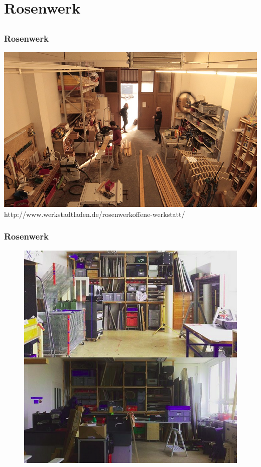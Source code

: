 \documentclass[12pt]{beamer}
\newcommand{\license}[2][]{\\#2\ifthenelse{\equal{#1}{}}{}{\\\scriptsize\url{#1}}}
\begin{document}
\section{Rosenwerk}
	\subsection{}

\begin{frame}
  \frametitle{Rosenwerk}
  \begin{minipage}{\linewidth}
	\centering	
	\includegraphics[height=0.6\textheight]{img//rosenwerk-holzwerkstatt-Foto_Carolin_Partsch.jpg}
	\tiny\license{http://www.werkstadtladen.de/rosenwerkoffene-werkstatt/}
	\end{minipage}
  \end{frame}
  \begin{frame}
	\frametitle{Rosenwerk}
	\begin{figure}
	  \includegraphics[height=0.7\textheight]{img/rosenwerk-siebdruckwerkstatt.png}
	\end{figure}
  \end{frame}
\end{document}
